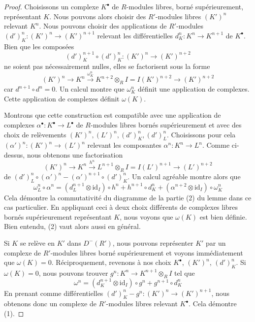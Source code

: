 \begin{proof}
Choisissons un complexe $K^\bullet$ de $R$-modules libres, borné
supérieurement, représentant $K$. Nous pouvons alors choisir des
$R'$-modules libres $(K')^n$ relevant $K^n$.
Nous pouvons choisir des applications de $R'$-modules
$(d')^n_K : (K')^n \to (K')^{n + 1}$ relevant les différentielles
$d^n_K : K^n \to K^{n + 1}$ de $K^\bullet$.
Bien que les composées
$$
(d')^{n + 1}_K \circ (d')^n_K : (K')^n \to (K')^{n + 2}
$$
ne soient pas nécessairement nulles, elles se factorisent sous la forme
$$
(K')^n \to K^n \xrightarrow{\omega^n_K}
K^{n + 2} \otimes_R I = I(K')^{n + 2} \to (K')^{n + 2}
$$
car $d^{n + 1} \circ d^n = 0$.
Un calcul montre que $\omega^n_K$ définit une application de complexes.
Cette application de complexes définit $\omega(K)$.

\medskip\noindent
Montrons que cette construction est compatible avec une application de
complexes $\alpha^\bullet : K^\bullet \to L^\bullet$ de $R$-modules libres
bornés supérieurement et avec des choix de relèvements
$(K')^n, (L')^n, (d')^n_K, (d')^n_L$.
Choisissons pour cela $(\alpha')^n : (K')^n \to (L')^n$ relevant les
composantes $\alpha^n : K^n \to L^n$. Comme ci-dessus, nous obtenons une
factorisation
$$
(K')^n \to K^n \xrightarrow{h^n}
L^{n + 1} \otimes_R I = I(L')^{n + 1} \to (L')^{n + 2}
$$
de $(d')^n_L \circ (\alpha')^n - (\alpha')^{n + 1} \circ (d')_K^n$.
Un calcul agréable montre alors que
$$
\omega^n_L \circ \alpha^n =
(d_L^{n + 1} \otimes \text{id}_I) \circ h^n + h^{n + 1} \circ d_K^n +
(\alpha^{n + 2} \otimes \text{id}_I) \circ \omega^n_K
$$
Cela démontre la commutativité du diagramme de la partie (2) du lemme dans ce
cas particulier. En appliquant ceci à deux choix différents de complexes
libres bornés supérieurement représentant $K$, nous voyons que $\omega(K)$ est
bien définie. Bien entendu, (2) vaut alors aussi en général.

\medskip\noindent
Si $K$ se relève en $K'$ dans $D^-(R')$, nous pouvons représenter $K'$ par un
complexe de $R'$-modules libres borné supérieurement et voyons immédiatement
que $\omega(K) = 0$.
Réciproquement, revenons à nos choix $K^\bullet$,
$(K')^n$, $(d')^n_K$. Si $\omega(K) = 0$, nous pouvons trouver
$g^n : K^n \to K^{n + 1} \otimes_R I$ tel que
$$
\omega^n = (d_K^{n + 1} \otimes \text{id}_I) \circ g^n +
g^{n + 1} \circ d_K^n
$$
En prenant comme différentielles
$(d')^n_K - g^n : (K')^n \to (K')^{n + 1}$, nous obtenons donc un complexe de
$R'$-modules libres relevant $K^\bullet$. Cela démontre (1).


\end{proof}
